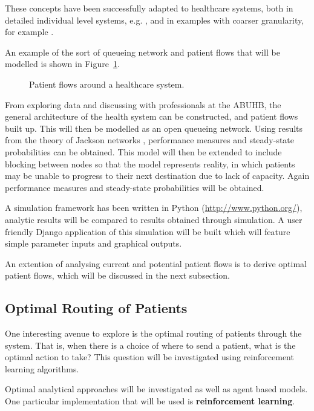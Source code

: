 \documentclass{article}
\begin{document}
These concepts have been successfully adapted to healthcare systems, both in detailed individual level systems, e.g. \cite{albinetal90}, \cite{creemerslambrecht07} and in examples with coarser granularity, for example \cite{koizumietal05}.

An example of the sort of queueing network and patient flows that will be modelled is shown in Figure~\ref{fig:healthsystem}.

\begin{figure}[H]
    
    \caption{Patient flows around a healthcare system.}
    \label{fig:healthsystem}
\end{figure}

From exploring data and discussing with professionals at the ABUHB, the general architecture of the health system can be constructed, and patient flows built up.
This will then be modelled as an open queueing network.
Using results from the theory of Jackson networks \cite{jackson57}, performance measures and steady-state probabilities can be obtained.
This model will then be extended to include blocking between nodes so that the model represents reality, in which patients may be unable to progress to their next destination due to lack of capacity.
Again performance measures and steady-state probabilities will be obtained.

A simulation framework has been written in Python (\url{http://www.python.org/}),
analytic results will be compared to results obtained through simulation.
A user friendly Django application of this simulation will be built which will
feature simple parameter inputs and graphical outputs.

An extention of analysing current and potential patient flows is to derive optimal patient flows, which will be discussed in the next subsection.

\subsection{Optimal Routing of Patients}

One interesting avenue to explore is the optimal routing of patients through the system.
That is, when there is a choice of where to send a patient, what is the optimal action to take?
This question will be investigated using reinforcement learning algorithms.

Optimal analytical approaches will be investigated as well as agent based
models. One particular implementation that will be used is
\textbf{reinforcement learning}.
\end{document}
